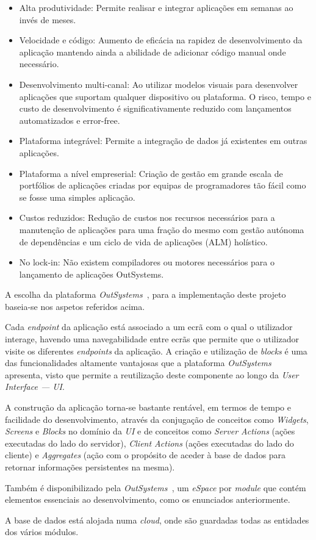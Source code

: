 \begin{itemize}
    \item Alta produtividade: Permite realisar e integrar aplicações em semanas ao invés de meses.
    \item Velocidade e código: Aumento de eficácia na rapidez de desenvolvimento da aplicação mantendo ainda a abilidade de adicionar código manual onde necessário.
    \item Desenvolvimento multi-canal: Ao utilizar modelos visuais para desenvolver aplicações que suportam qualquer dispositivo ou plataforma. 
    O risco, tempo e custo de desenvolvimento é significativamente reduzido com lançamentos automatizados e error-free.
    \item Plataforma integrável: Permite a integração de dados já existentes em outras aplicações.
    \item Plataforma a nível empreserial: Criação de gestão em grande escala de portfólios de aplicações criadas por equipas de programadores tão fácil como se fosse uma simples aplicação.
    \item Custos reduzidos: Redução de custos nos recursos necessários para a manutenção de aplicações para uma fração do mesmo com gestão autónoma de dependências e um ciclo de vida de aplicações (ALM) holístico.
    \item No lock-in: Não existem compiladores ou motores necessários para o lançamento de aplicações OutSystems.
\end{itemize}

A escolha da plataforma \textit{OutSystems~\cite{outsystems}}, para a implementação deste projeto baseia-se nos aspetos referidos acima.
\par
Cada \textit{endpoint} da aplicação está associado a um ecrã com o qual o utilizador interage, havendo uma navegabilidade entre ecrãs que permite que o utilizador visite os diferentes \textit{endpoints} da aplicação.
A criação e utilização de \textit{blocks} é uma das funcionalidades altamente vantajosas que a plataforma \textit{OutSystems~\cite{outsystems}} apresenta, 
visto que permite a reutilização deste componente ao longo da \textit{User Interface --- UI}.
\par
A construção da aplicação torna-se bastante rentável, em termos de tempo e facilidade do desenvolvimento, 
através da conjugação de conceitos como \textit{Widgets}, \textit{Screens} e \textit{Blocks} no domínio da  \textit{UI} 
e de conceitos como \textit{Server Actions} (ações executadas do lado do servidor), \textit{Client Actions} (ações executadas do lado do cliente) 
e \textit{Aggregates} (ação com o propósito de aceder à base de dados para retornar informações persistentes na mesma).
\par
Também é disponibilizado pela \textit{OutSystems~\cite{outsystems}}, um \textit{eSpace} por \textit{module} que contém elementos essenciais 
ao desenvolvimento, como os enunciados anteriormente.
\par
A base de dados está alojada numa \textit{cloud}, onde são guardadas todas as entidades dos vários módulos.
